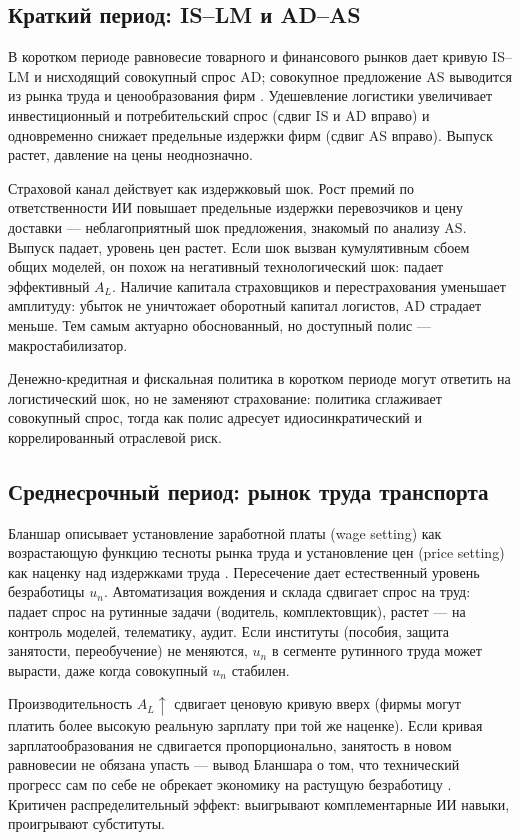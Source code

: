 \documentclass[a4paper,14pt]{extarticle}
\begin{document}
\subsection{Краткий период: IS--LM и AD--AS}

В коротком периоде равновесие товарного и финансового рынков дает кривую IS--LM и нисходящий совокупный спрос AD; совокупное предложение AS выводится из рынка труда и ценообразования фирм \cite{blanchard}. Удешевление логистики увеличивает инвестиционный и потребительский спрос (сдвиг IS и AD вправо) и одновременно снижает предельные издержки фирм (сдвиг AS вправо). Выпуск растет, давление на цены неоднозначно.

Страховой канал действует как издержковый шок. Рост премий по ответственности ИИ повышает предельные издержки перевозчиков и цену доставки --- неблагоприятный шок предложения, знакомый по анализу AS. Выпуск падает, уровень цен растет. Если шок вызван кумулятивным сбоем общих моделей, он похож на негативный технологический шок: падает эффективный $A_L$. Наличие капитала страховщиков и перестрахования уменьшает амплитуду: убыток не уничтожает оборотный капитал логистов, AD страдает меньше. Тем самым актуарно обоснованный, но доступный полис --- макростабилизатор.

Денежно-кредитная и фискальная политика в коротком периоде могут ответить на логистический шок, но не заменяют страхование: политика сглаживает совокупный спрос, тогда как полис адресует идиосинкратический и коррелированный отраслевой риск.

\subsection{Среднесрочный период: рынок труда транспорта}

Бланшар описывает установление заработной платы (wage setting) как возрастающую функцию тесноты рынка труда и установление цен (price setting) как наценку над издержками труда \cite{blanchard}. Пересечение дает естественный уровень безработицы $u_n$. Автоматизация вождения и склада сдвигает спрос на труд: падает спрос на рутинные задачи (водитель, комплектовщик), растет --- на контроль моделей, телематику, аудит. Если институты (пособия, защита занятости, переобучение) не меняются, $u_n$ в сегменте рутинного труда может вырасти, даже когда совокупный $u_n$ стабилен.

Производительность $A_L\uparrow$ сдвигает ценовую кривую вверх (фирмы могут платить более высокую реальную зарплату при той же наценке). Если кривая зарплатообразования не сдвигается пропорционально, занятость в новом равновесии не обязана упасть --- вывод Бланшара о том, что технический прогресс сам по себе не обрекает экономику на растущую безработицу \cite{blanchard}. Критичен распределительный эффект: выигрывают комплементарные ИИ навыки, проигрывают субституты.
\end{document}
